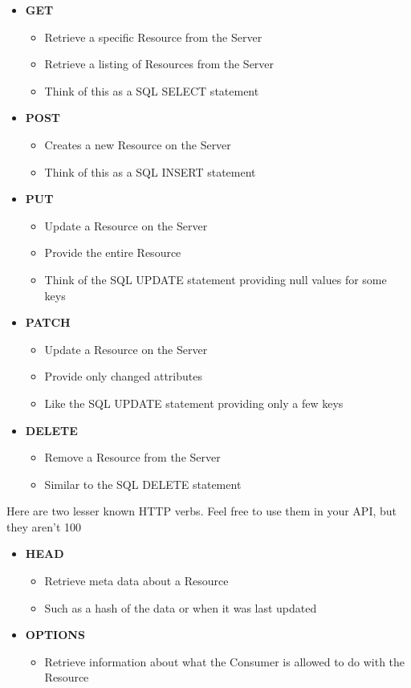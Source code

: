 \documentclass{book}
\begin{document}
\begin{itemize}
\item \textbf{GET}
    \begin{itemize}
    \item Retrieve a specific Resource from the Server
    \item Retrieve a listing of Resources from the Server
    \item Think of this as a SQL SELECT statement
    \end{itemize}
\item \textbf{POST}
    \begin{itemize}
    \item Creates a new Resource on the Server
    \item Think of this as a SQL INSERT statement
    \end{itemize}
\item \textbf{PUT}
    \begin{itemize}
    \item Update a Resource on the Server
    \item Provide the entire Resource
    \item Think of the SQL UPDATE statement providing null values for some keys
    \end{itemize}
\item \textbf{PATCH}
    \begin{itemize}
    \item Update a Resource on the Server
    \item Provide only changed attributes
    \item Like the SQL UPDATE statement providing only a few keys
    \end{itemize}
\item \textbf{DELETE}
    \begin{itemize}
    \item Remove a Resource from the Server
    \item Similar to the SQL DELETE statement
    \end{itemize}
\end{itemize}

Here are two lesser known HTTP verbs. Feel free to use them in your API, but they aren't 100%

\begin{itemize}
\item \textbf{HEAD}
    \begin{itemize}
    \item Retrieve meta data about a Resource
    \item Such as a hash of the data or when it was last updated
    \end{itemize}
\item \textbf{OPTIONS}
    \begin{itemize}
    \item Retrieve information about what the Consumer is allowed to do with the Resource
    \end{itemize}
\end{itemize}
\end{document}
